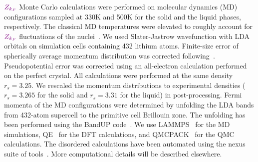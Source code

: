 \documentclass[twocolumn,showpacs,showkeys,fleqn,prl,superscriptaddress]{revtex4}%
\begin{document}
\vspace{10mm}

${\color{violet}Z_{k_F}}$ Monte Carlo calculations were performed on molecular dynamics (MD) configurations sampled at 330K and 500K for the solid and the liquid phases, respectively. The classical MD temperatures were elevated to roughly account for ${\color{violet}Z_{k_F}}$ fluctuations of the nuclei~\cite{filippi98}. We used Slater-Jastrow wavefunction with LDA orbitals on simulation cells containing 432 lithium atoms. Finite-size error of spherically average momentum distribution was corrected following~\cite{holz09}. Pseudopotential error was corrected using an all-electron calculation performed on the perfect crystal. All calculations were performed at the same density $r_s=3.25$. We rescaled the momentum distributions to experimental densities ($r_s=3.265$ for the solid and $r_s=3.31$ for the liquid) in post-processing. Fermi momenta of the MD configurations were determined by unfolding the LDA bands from 432-atom supercell to the primitive cell Brillouin zone. The unfolding has been performed using the BandUP code~\cite{Medeiros2014,Medeiros2015}.  We use LAMMPS~\cite{Plimpton1993} for the MD simulations, QE~\cite{Giannozzi2009,Enkovaara2017} for the DFT calculations, and QMCPACK~\cite{Kim2018} for the QMC calculations. The disordered calculations have been automated using the nexus suite of tools~\cite{Krogel2016}.
More computational details will be described elsewhere.

\vspace{10mm}
\end{document}
